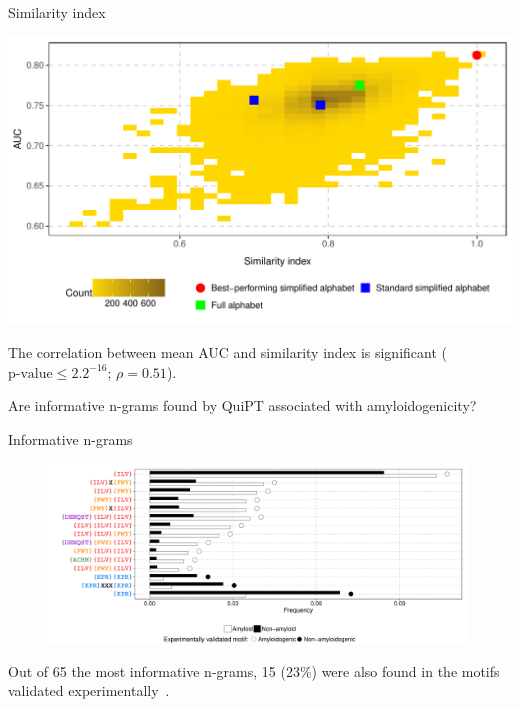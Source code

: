 \documentclass{beamer}\usepackage[]{graphicx}\usepackage[]{color}
\makeatletter
\def\maxwidth{ %
  \ifdim\Gin@nat@width>\linewidth
    \linewidth
  \else
    \Gin@nat@width
  \fi
}
\newenvironment{knitrout}{}{} %
\makeatother
\begin{document}
\begin{frame}{Similarity index}
\begin{knitrout}
\color{fgcolor}

{\centering \includegraphics[width=\maxwidth]{figure/unnamed-chunk-19-1} 

}



\end{knitrout}
The correlation between mean AUC and similarity index is significant ($\textrm{p-value} \leq 2.2^{-16}$; $\rho = 0.51$).
\end{frame}
   
\begin{frame}{}
Are informative n-grams found by QuiPT associated with amyloidogenicity?
\end{frame}


\begin{frame}{Informative n-grams}
\begin{figure} 
\includegraphics[width=0.99\textwidth]{static_figure/ngrams.pdf}
\end{figure}

Out of 65 the most informative n-grams, 15 (23\%) were also found in the motifs validated experimentally~\citep{paz_sequence_2004}.
\end{frame}
\end{document}
